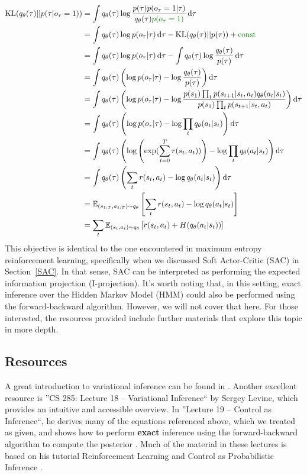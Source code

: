 \begin{align*}
    \text{KL}(q_\theta(\tau)|| p(\tau|o_\tau=1)) &= \int q_\theta(\tau) \log{ \frac{p(\tau){p(o_\tau=1 | \tau)}}{q_\theta(\tau)\color{green!50!black}p(o_\tau=1)}} \diff \tau \\
    &=\int q_\theta(\tau)\log{p(o_\tau|\tau)}\diff \tau - \text{KL}(q_\theta(\tau)||p(\tau)) + \text{\color{green!50!black}const} \\
    &=\int q_\theta(\tau)\log{p(o_\tau|\tau)}\diff \tau - \int q_\theta(\tau)\log{\frac{q_\theta(\tau)}{p(\tau)}}\diff \tau \\
    &= \int  q_\theta(\tau) \left(\log{p(o_\tau|\tau)} - \log{\frac{q_\theta(\tau)}{p(\tau)}}\right) \diff \tau \\
    &= \int  q_\theta(\tau) \left(\log{p(o_\tau|\tau)} - \log{\frac{ p(s_1)\prod_t p(s_{t+1}|s_t,a_t)q_\theta(a_t|s_t)}{ p(s_1) \prod_{t}p(s_{t+1}|s_t,a_t)}}\right) \diff \tau \\
    &=\int  q_\theta(\tau) \left(\log{p(o_\tau|\tau)} - \log{\prod_t q_\theta(a_t|s_t)}\right) \diff \tau \\
    &=\int  q_\theta(\tau) \left(\log{\left(\exp(\sum_{t=0}^T r(s_t,a_t))\right)} - \log{\prod_t q_\theta(a_t|s_t)}\right) \diff \tau \\
    &=\int  q_\theta(\tau) \left(\sum_t r(s_t,a_t) -\log{q_\theta(a_t|s_t)}\right) \diff \tau \\
    &=  \mathbb{E}_{(s_{1:T},a_{1:T})\sim q_\theta}\left[\sum_t r(s_t,a_t) -\log{q_\theta(a_t|s_t)}\right] \\
    &=  \sum_t\mathbb{E}_{(s_t,a_t)\sim q_\theta}\left[r(s_t,a_t) +H(q_\theta(a_t|s_t))\right] 
\end{align*}
This objective is identical to the one encountered in maximum entropy reinforcement learning, specifically when we 
discussed Soft Actor-Critic (SAC) in Section~\ref{SAC}. In that sense, SAC can be interpreted as performing the 
expected information projection (I-projection).\newline
It’s worth noting that, in this setting, exact inference over the Hidden Markov Model (HMM) could also be performed 
using the forward-backward algorithm. However, we will not cover that here. For those interested, the resources 
provided include further materials that explore this topic in more depth.

\subsection{Resources}
A great introduction to variational inference can be found in \cite{Blei_2017}. Another excellent resource is 
''CS 285: Lecture 18 – Variational Inference`` by Sergey Levine, which provides an intuitive and accessible overview. 
In ''Lecture 19 – Control as Inference``, he derives many of the equations referenced above, which we treated as 
given, and shows how to perform \textbf{exact} inference using the forward-backward algorithm to compute the 
posterior \cite{CS285,CS285LevineYoutube}. Much of the material in these lectures is based on his tutorial 
Reinforcement Learning and Control as Probabilistic Inference 
\cite{levine2018reinforcementlearningcontrolprobabilistic}.